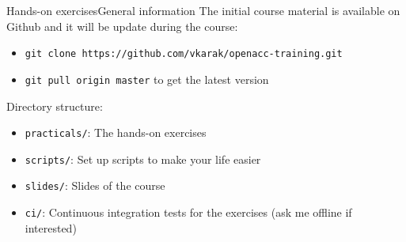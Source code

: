 \documentclass[12pt,aspectratio=169]{beamer}
\newcommand\shinline[2][]{\lstinline[style=shstyle,basicstyle=\ttfamily,#1]!#2!}
\begin{document}

\begin{frame}[fragile]{Hands-on exercises}{General information}
  The initial course material is available on Github and it will be update during the course:
  \begin{itemize}
  \item \shinline{git clone https://github.com/vkarak/openacc-training.git}
  \item \shinline{git pull origin master} to get the latest version
  \end{itemize}
  \vfill
  Directory structure:
  \begin{itemize}
  \item \texttt{practicals/}: The hands-on exercises
  \item \texttt{scripts/}: Set up scripts to make your life easier
  \item \texttt{slides/}: Slides of the course
  \item \texttt{ci/}: Continuous integration tests for the exercises (ask me offline if interested)
  \end{itemize}
\end{frame}
\end{document}

